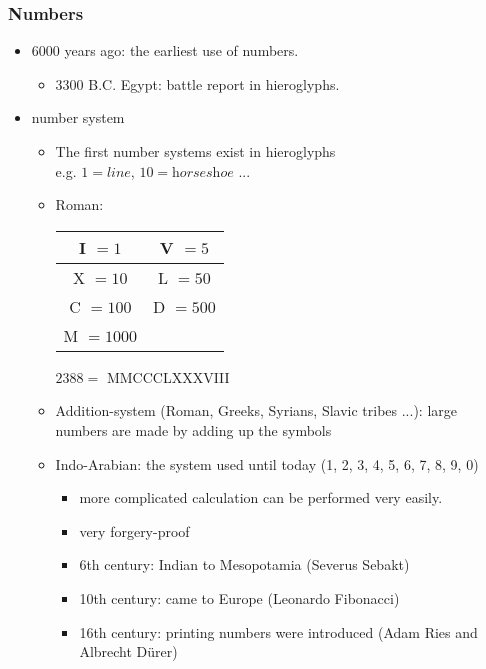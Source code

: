 \documentclass{standalone}
\begin{document}
\subsubsection*{Numbers}
\begin{itemize}
	\item 6000 years ago: the earliest use of numbers. 
		\begin{itemize}
			\item 3300 B.C. Egypt: battle report in hieroglyphs.
		\end{itemize} 
	\item number system 
		\begin{itemize}
			\item The first number systems exist in hieroglyphs \\ e.g. $1=\textit{line}$, $10=\textit{horseshoe}$ ...
			\item Roman: 

				\begin{table}[h]
				\centering
				\begin{tabular}{| c | c | }
				\hline
				I $= 1$		& V $= 5$ 	\\
				\hline 
				X $= 10$	& L $= 50$ 	\\
				\hline							
				C $= 100$	& D $= 500$ \\
				\hline					
				M $= 1000$ 	& 			\\		
				\hline					
				\end{tabular}
				\end{table}
				
				\begin{center}
				$2388 =$ MMCCCLXXXVIII
				\end{center}
			
			\item Addition-system (Roman, Greeks, Syrians, Slavic tribes ...): large numbers are made by adding up the symbols 
			\item Indo-Arabian: the system used until today (1, 2, 3, 4, 5, 6, 7, 8, 9, 0)
				\begin{itemize}
					\item more complicated calculation can be performed very easily.
					\item very forgery-proof
					\item 6th century: Indian to Mesopotamia (Severus Sebakt)
					\item 10th century: came to Europe (Leonardo Fibonacci)
					\item 16th century: printing numbers were introduced (Adam Ries and Albrecht Dürer) 
				\end{itemize}				
		\end{itemize}
\end{itemize}
\end{document}
